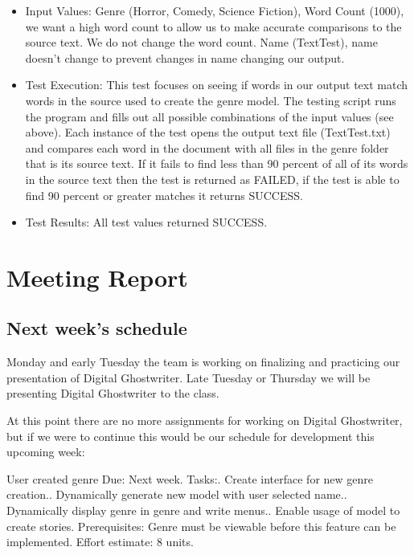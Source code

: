 \documentclass[12pt]{article}
\begin{document}
\begin{itemize}
\item Input Values: Genre (Horror, Comedy, Science Fiction), \newline
Word Count (1000), we want a high word count to allow us to make accurate comparisons to the source text. We do not change the word count.
Name (TextTest), name doesn't change to prevent changes in name changing our output.  
\item Test Execution: This test focuses on seeing if words in our output text match words in the source used to create the genre model. The testing script runs the program and fills out all possible combinations of the input values (see above). Each instance of the test opens the output text file (TextTest.txt) and compares each word in the document with all files in the genre folder that is its source text. If it fails to find less than 90 percent of all of its words in the source text then the test is returned as FAILED, if the test is able to find 90 percent or greater matches it returns SUCCESS.
\item Test Results: All test values returned SUCCESS.
\end{itemize}

\section{Meeting Report }

\subsection{Next week's schedule}
Monday and early Tuesday the team is working on finalizing and practicing our presentation of Digital Ghostwriter.
Late Tuesday or Thursday we will be presenting Digital Ghostwriter to the class.

At this point there are no more assignments for working on Digital Ghostwriter, but if we were to continue this would be our schedule for development this upcoming week:

User created genre\newline
Due: Next week.\newline
Tasks:. Create interface for new genre creation.. Dynamically generate new model with user selected name.. Dynamically display genre in genre and write menus.. Enable usage of model to create stories.\newline
Prerequisites:\newline
Genre must be viewable before this feature can be implemented.\newline
Effort estimate: 8 units.
\end{document}
